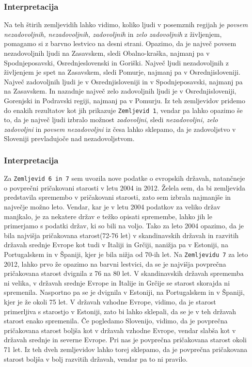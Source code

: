 \documentclass[11pt,a4paper]{article}
\begin{document}
\subsubsection{Interpretacija}
Na teh štirih zemljevidih lahko vidimo, koliko ljudi v posemznih regijah je \textit{povsem nezadovoljnih, nezadovoljnih, zadovoljnih} in \textit{zelo zadovoljnih} z življenjem, pomagamo si z barvno lestvico na desni strani. Opazimo, da je največ povsem nezadovoljnih ljudi na Zasavskem, sledi Obalno-kraška, najmanj pa v Spodnjeposavski, Osrednjeslovenski in Goriški. Največ ljudi nezadovoljnih z življenjem je spet na Zasavskem, sledi Pomurje, najmanj pa v Osrednjisloveniji. Največ zadovoljnih ljudi je v Osrednjisloveniji in v Spodnjeposavski, najmanj pa na Zasavskem. In nazadnje največ zelo zadovoljnih ljudi je v Osrednjisloveniji, Gorenjski in Podravski regiji, najmanj pa v Pomurju. Iz teh zemljevidov pridemo do enakih rezultatov kot jih prikazuje \verb+Zemljevid 1+, vendar pa lahko opazimo še to, da je največ ljudi izbralo možnost \textit{zadovoljni}, sledi \textit{nezadovoljni, zelo zadovoljni} in \textit{povsem nezadovoljni} iz česa lahko sklepamo, da je zadovoljstvo v Sloveniji prevladujoče nad nezadovoljstvom.

\subsubsection{Interpretacija}
Za \verb+Zemljevid 6 in 7+ sem uvozila nove podatke o evropskih državah, natančneje o povprečni pričakovani starosti v letu 2004 in 2012. Želela sem, da bi zemljevida predstavila spremembo v pričakovani starosti, zato sem izbrala najmanjše in največje možno leto. Vendar, kar je v letu 2004 podatkov za veliko držav manjkalo, je za nekatere držav e težko opisati spremembe, lahko jih le primerjamo s podatki držav, ki so bili na voljo. Tako za leto 2004 opazimo, da je bila najvišja pričakovana starost(72-76 let) v skandinavskih državah in razvitih državah srednje Evrope kot tudi v Italiji in Grčiji, nanižja pa v Estoniji, na Portugalskem in v Španiji, kjer je bila nižja od 70-ih let. Na \verb+Zemljevidu 7+ za leto 2012, lahko prvo že opazimo na barvni lestvici, da se je najvišja povprečna pričakovana starost dvignila z 76 na 80 let. V skandinavskih državah sprememba ni velika, v državah srednje Evrope in Italije in Grčije se starost skorajda ni spremenila. Nasportno pa se je dvignila v Estoniji, na Portugalskem in v Španiji, kjer je že okoli 75 let. V državah vzhodne Evrope, vidimo, da je starost primerljiva s starostjo v Estoniji, zato bi lahko sklepali, da se je v teh državah starost enako spremenila. Če pogledamo Slovenijo, vidimo, da je povprečna pričakovana starost boljša kot v državah vzhodne Evrope, vendar slabša kot v državah srednje in severne Evrope. Pri nas je povprečna pričakovana starost okoli 71 let. Iz teh dveh zemljevidov lahko torej sklepamo, da je povprečna pričakovana starost boljša v bolj razvitih državah, vendar pa to ni pravilo.
\end{document}
